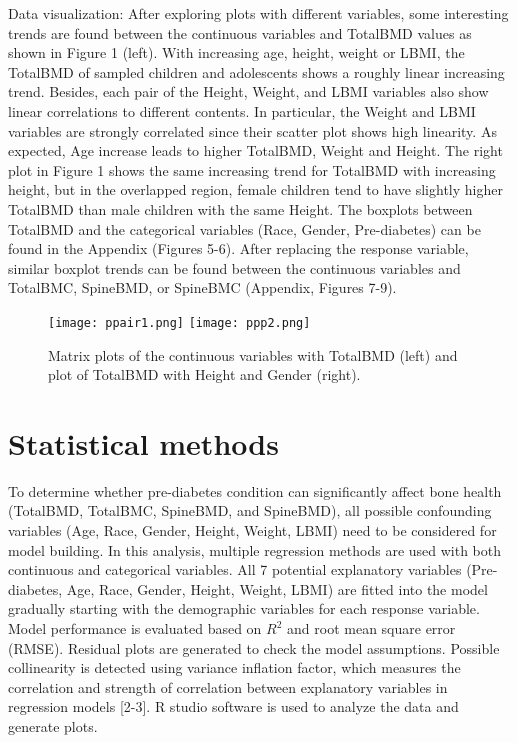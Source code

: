 \documentclass[11pt]{article}
\begin{document}
\medskip

Data visualization: After exploring plots with different variables, some interesting trends are found between the continuous variables and TotalBMD values as shown in Figure 1 (left). With increasing age, height, weight or LBMI, the TotalBMD of sampled children and adolescents shows a roughly linear increasing trend. Besides, each pair of the Height, Weight, and LBMI variables also show linear correlations to different contents. In particular, the Weight and LBMI variables are strongly correlated since their scatter plot shows high linearity. As expected, Age increase leads to higher TotalBMD, Weight and Height. The right plot in Figure 1 shows the same increasing trend for TotalBMD with increasing height, but in the overlapped region, female children tend to have slightly higher TotalBMD than male children with the same Height. The boxplots between TotalBMD and the categorical variables (Race, Gender, Pre-diabetes) can be found in the Appendix (Figures 5-6). After replacing the response variable, similar boxplot trends can be found between the continuous variables and TotalBMC, SpineBMD, or SpineBMC (Appendix, Figures 7-9).  

            \begin{figure}[!htbp]

 \texttt{[image: ppair1.png]}
  \texttt{[image: ppp2.png]}
            \caption{Matrix plots of the continuous variables with TotalBMD (left) and plot of TotalBMD with Height and Gender (right).}
            \label{fig:method}
            \end{figure}
            
            

\section{Statistical methods}
To determine whether pre-diabetes condition can significantly affect bone health (TotalBMD, TotalBMC, SpineBMD, and SpineBMD), all possible confounding variables (Age, Race, Gender, Height, Weight, LBMI) need to be considered for model building. In this analysis, multiple regression methods are used with both continuous and categorical variables. All 7 potential explanatory variables (Pre-diabetes, Age, Race, Gender, Height, Weight, LBMI) are fitted into the model gradually starting with the demographic variables for each response variable. Model performance is evaluated based on $R^2$ and root mean square error (RMSE). Residual plots are generated to check the model assumptions. Possible collinearity is detected using variance inflation factor, which measures the correlation and strength of correlation between explanatory variables in regression models [2-3]. R studio software is used to analyze the data and generate plots. 
\end{document}

